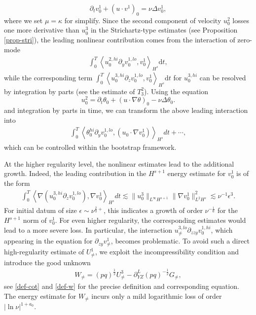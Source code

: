 \documentclass[12pt]{article}
\def\d{\mathrm{d}}
\numberwithin{equation}{section}
\begin{document}
	\begin{equation*}
		\partial_t v^1_0+(u\cdot v^1)_0=\nu\Delta v^1_0,
	\end{equation*}
    where we set $\mu=\kappa$ for simplify. Since the second component of velocity $u_0^2$ losses one more derivative than $u_0^3$ in the Strichartz-type estimates (see Proposition \ref{prop-stri}), the leading nonlinear contribution comes from the interaction of zero-mode
	\begin{align*}
		\int_{0}^{T}\left\langle u^{2,hi}_0\partial_y v^{1,lo}_0, v^1_0\right\rangle_{H^s} \d t,
	\end{align*}
    while the corresponding term $\int_{0}^{T}\left\langle u^{3,hi}_0\partial_z v^{1,lo}_0, v^1_0\right\rangle_{H^s} \d t$ for $u_0^{3,hi}$ can be resolved by integration by parts (see the estimate of $T^2_3$). 
	Using the equation
    \begin{equation*}
		u^2_0=\partial_t \theta_0+(u\cdot\nabla\theta)_0-\nu \Delta \theta_0.
	\end{equation*}
	and integration by parts in time, we can transform the above leading interaction into
	\begin{align*}
		\int_{0}^{T}\left\langle \theta^{hi}_0\partial_y v^{1,lo}_0, (u_0\cdot \nabla v^1_0)\right\rangle_{H^s}dt+\cdots,
	\end{align*}
	which can be controlled within the bootstrap framework.	
	
	At the higher regularity level, the nonlinear estimates lead to the additional growth. Indeed, the leading contribution in the $H^{s+1}$ energy estimate for $v^1_0$ is of the form
	\begin{align*}
		\int_{0}^{T}\left\langle \nabla (u^{3,hi}_0\partial_z v^{1,lo}_0), \nabla v^1_0\right\rangle_{H^s}dt
		\lesssim\|u^3_0\|_{L^\infty H^{s+1}}\|\nabla v^1_0\|^2_{L^2H^s}\lesssim\nu^{-1}\epsilon^3.
	\end{align*}
	For initial datum of size $\epsilon\sim\nu^{\frac{2}{3}+}$, this indicates a growth of order $\nu^{-\frac{1}{6}}$ for the $H^{s+1}$ norm of $v^1_{0}$. For even higher regularity, the corresponding estimates would lead to a more severe loss. 
    In particular, the interaction $u^{3,lo}_{\neq}\partial_{zzy}v^{1,hi}_0$, which appearing in the equation for $\partial_{zy}v^1_{\neq}$, becomes problematic. 
	To avoid such a direct high-regularity estimate of $U^1_{\neq}$, we exploit the incompressibility  condition and introduce the good unknown
	\begin{align*}
		W_{\neq}=(pq)^{\frac{1}{2}}U^3_{\neq}-\partial_{YZ}^L{(pq)^{-\frac{1}{2}}}G_{\neq},
	\end{align*}
	see \eqref{def-cot} and \eqref{def-w} for the precise definition and corresponding equation. The energy estimate for $W_{\neq}$ incurs only a mild logarithmic loss of order $|\ln\nu|^{1+a_0}$.
	
\end{document}

